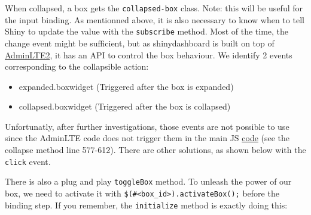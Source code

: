 \documentclass[]{book}
\providecommand{\tightlist}{%
  \setlength{\itemsep}{0pt}\setlength{\parskip}{0pt}}
\begin{document}
When collapsed, a box gets the \texttt{collapsed-box} class. Note: this will be useful for the input binding. As mentionned above, it is also necessary to know when to tell Shiny to update the value with the \texttt{subscribe} method. Most of the time, the change event might be sufficient, but as shinydashboard is built on top of \href{https://adminlte.io/docs/2.4/js-box-widget}{AdminLTE2}, it has an API to control the box behaviour. We identify 2 events corresponding to the collapsible action:

\begin{itemize}
\tightlist
\item
  expanded.boxwidget (Triggered after the box is expanded)
\item
  collapsed.boxwidget (Triggered after the box is collapsed)
\end{itemize}

Unfortunatly, after further investigations, those events are not possible to use since the AdminLTE code does not trigger them in the main JS \href{https://github.com/rstudio/shinydashboard/blob/master/srcjs/AdminLTE/app.js}{code} (see the collapse method line 577-612). There are other solutions, as shown below with the \texttt{click} event.

There is also a plug and play \texttt{toggleBox} method. To unleash the power of our box, we need to activate it with \texttt{\$(\textquotesingle{}\#\textless{}box\_id\textgreater{}\textquotesingle{}).activateBox();} before the binding step. If you remember, the \texttt{initialize} method is exactly doing this:
\end{document}
